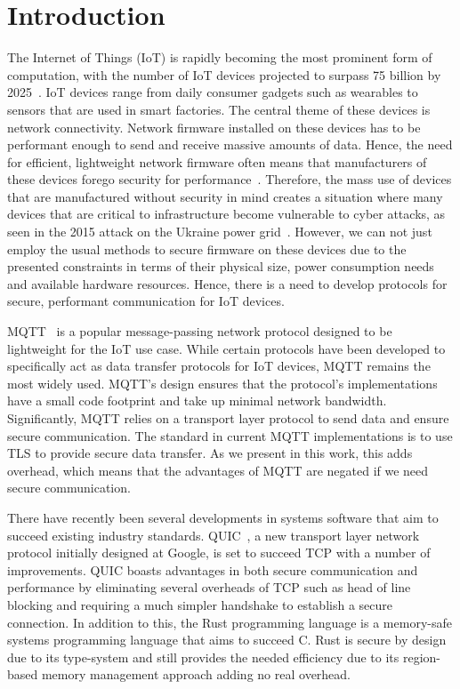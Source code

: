 \chapter{Introduction}


The Internet of Things (IoT) is rapidly becoming the most prominent form of computation, with the number of IoT devices projected to surpass 75 billion by 2025~\citep{statista_number_2016}.
IoT devices range from daily consumer gadgets such as wearables to sensors that are used in smart factories.
The central theme of these devices is network connectivity.
Network firmware installed on these devices has to be performant enough to send and receive massive amounts of data. 
Hence, the need for efficient, lightweight network firmware often means that manufacturers of these devices forego security for performance~\cite{ling_iot_2018}.
Therefore, the mass use of devices that are manufactured without security in mind creates a situation where many devices that are critical to infrastructure become vulnerable to cyber attacks, as seen in the 2015 attack on the Ukraine power grid~\citep{Liang2017}.
However, we can not just employ the usual methods to secure firmware on these devices due to the presented constraints in terms of their physical size, power consumption needs and available hardware resources.
Hence, there is a need to develop protocols for secure, performant communication for IoT devices.

MQTT~\citep{oasis_mqtt_2014} is a popular message-passing network protocol designed to be lightweight for the IoT use case.
While certain protocols have been developed to specifically act as data transfer protocols for IoT devices, MQTT remains the most widely used.
MQTT's design ensures that the protocol's implementations have a small code footprint and take up minimal network bandwidth.
Significantly, MQTT relies on a transport layer protocol to send data and ensure secure communication.
The standard in current MQTT implementations is to use TLS to provide secure data transfer.
As we present in this work, this adds overhead, which means that the advantages of MQTT are negated if we need secure communication.

There have recently been several developments in systems software that aim to succeed existing industry standards.
QUIC~\citep{iyengar_quic_2021}, a new transport layer network protocol initially designed at Google, is set to succeed TCP with a number of improvements.
QUIC boasts advantages in both secure communication and performance by eliminating several overheads of TCP such as head of line blocking and requiring a much simpler handshake to establish a secure connection.
In addition to this, the Rust programming language is a memory-safe systems programming language that aims to succeed C.
Rust is secure by design due to its type-system and still provides the needed efficiency due to its region-based memory management approach adding no real overhead.

